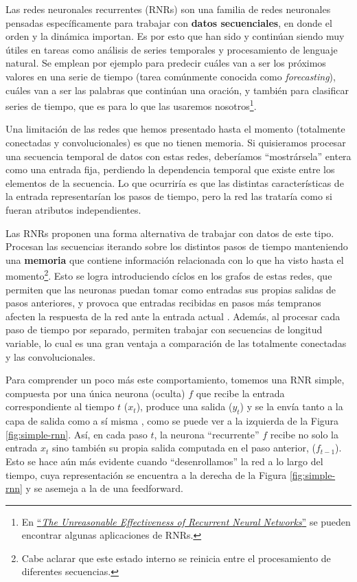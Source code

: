 \documentclass[../../main.tex]{subfiles}
\begin{document}
Las redes neuronales recurrentes (RNRs) son una familia de redes neuronales pensadas
específicamente para trabajar con \textbf{datos secuenciales}, en donde el orden y la
dinámica importan. Es por esto que han sido y continúan siendo muy útiles en tareas como
análisis de series temporales y procesamiento de lenguaje natural. Se emplean por ejemplo
para predecir cuáles van a ser los próximos valores en una serie de tiempo (tarea
comúnmente conocida como \textit{forecasting}), cuáles van a ser las palabras que
continúan una oración, y también para clasificar series de tiempo, que es para lo que las
usaremos nosotros\footnote{En
\href{https://karpathy.github.io/2015/05/21/rnn-effectiveness/}{``\textit{The Unreasonable
Effectiveness of Recurrent Neural Networks}''} se pueden encontrar algunas aplicaciones de
RNRs.}.

Una limitación de las redes que hemos presentado hasta el momento (totalmente conectadas y
convolucionales) es que no tienen memoria. Si quisieramos procesar una secuencia temporal
de datos con estas redes, deberíamos ``mostrársela'' entera como una entrada fija,
perdiendo la dependencia temporal que existe entre los elementos de la secuencia. Lo que
ocurriría es que las distintas características de la entrada representarían los pasos de
tiempo, pero la red las trataría como si fueran atributos independientes.

Las RNRs proponen una forma alternativa de trabajar con datos de este tipo. Procesan las
secuencias iterando sobre los distintos pasos de tiempo manteniendo una \textbf{memoria}
que contiene información relacionada con lo que ha visto hasta el momento\footnote{Cabe
aclarar que este estado interno se reinicia entre el procesamiento de diferentes
secuencias.}. Esto se logra introduciendo cíclos en los grafos de estas redes, que
permiten que las neuronas puedan tomar como entradas sus propias salidas de pasos
anteriores, y provoca que entradas recibidas en pasos más tempranos afecten la respuesta
de la red ante la entrada actual \cite{ai-a-modern-approach}. Además, al procesar cada
paso de tiempo por separado, permiten trabajar con secuencias de longitud variable, lo
cual es una gran ventaja a comparación de las totalmente conectadas y las convolucionales.

Para comprender un poco más este comportamiento, tomemos una RNR simple, compuesta por una
única neurona (oculta) \(f\) que recibe la entrada correspondiente al tiempo \(t\)
(\(x_t\)), produce una salida (\(y_t\)) y se la envía tanto a la capa de salida como a sí
misma \cite{hands-on-ML-sklearn-tf}, como se puede ver a la izquierda de la Figura
\ref{fig:simple-rnn}. Así, en cada paso \(t\), la neurona ``recurrente'' \(f\) recibe no
solo la entrada \(x_t\) sino también su propia salida computada en el paso anterior,
(\(f_{t-1}\)). Esto se hace aún más evidente cuando ``desenrollamos'' la red a lo largo del
tiempo, cuya representación se encuentra a la derecha de la Figura \ref{fig:simple-rnn} y
se asemeja a la de una feedforward.
\end{document}
